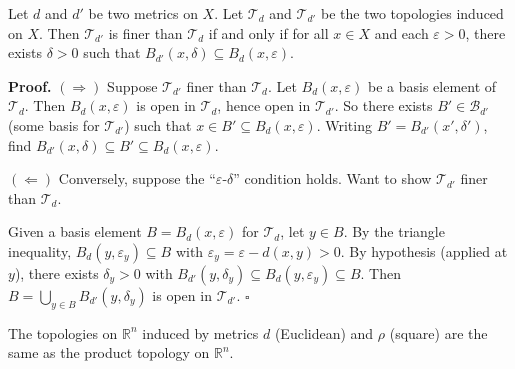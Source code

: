 \documentclass[11pt]{report}
\renewenvironment{proof}[1][Proof]{\noindent\textbf{#1.} }{\hfill$\square$\par\vspace{5pt}}
\begin{document}
\begin{lembox}
Let $d$ and $d'$ be two metrics on $X$. Let $\mathcal{T}_d$ and $\mathcal{T}_{d'}$ be the two topologies induced on $X$. Then $\mathcal{T}_{d'}$ is finer than $\mathcal{T}_d$ if and only if for all $x \in X$ and each $\varepsilon > 0$, there exists $\delta > 0$ such that $B_{d'}(x, \delta) \subseteq B_d(x, \varepsilon)$.
\end{lembox}

\begin{proof}
$(\Rightarrow)$ Suppose $\mathcal{T}_{d'}$ finer than $\mathcal{T}_d$. Let $B_d(x, \varepsilon)$ be a basis element of $\mathcal{T}_d$. Then $B_d(x, \varepsilon)$ is open in $\mathcal{T}_d$, hence open in $\mathcal{T}_{d'}$. So there exists $B' \in \mathcal{B}_{d'}$ (some basis for $\mathcal{T}_{d'}$) such that $x \in B' \subseteq B_d(x, \varepsilon)$. Writing $B' = B_{d'}(x', \delta')$, find $B_{d'}(x, \delta) \subseteq B' \subseteq B_d(x, \varepsilon)$.

$(\Leftarrow)$ Conversely, suppose the ``$\varepsilon$-$\delta$'' condition holds. Want to show $\mathcal{T}_{d'}$ finer than $\mathcal{T}_d$.

Given a basis element $B = B_d(x, \varepsilon)$ for $\mathcal{T}_d$, let $y \in B$. By the triangle inequality, $B_d(y, \varepsilon_y) \subseteq B$ with $\varepsilon_y = \varepsilon - d(x, y) > 0$. By hypothesis (applied at $y$), there exists $\delta_y > 0$ with $B_{d'}(y, \delta_y) \subseteq B_d(y, \varepsilon_y) \subseteq B$. Then $B = \bigcup_{y \in B} B_{d'}(y, \delta_y)$ is open in $\mathcal{T}_{d'}$.
\end{proof}

\begin{thmbox}
The topologies on $\mathbb{R}^n$ induced by metrics $d$ (Euclidean) and $\rho$ (square) are the same as the product topology on $\mathbb{R}^n$.
\end{thmbox}
\end{document}
